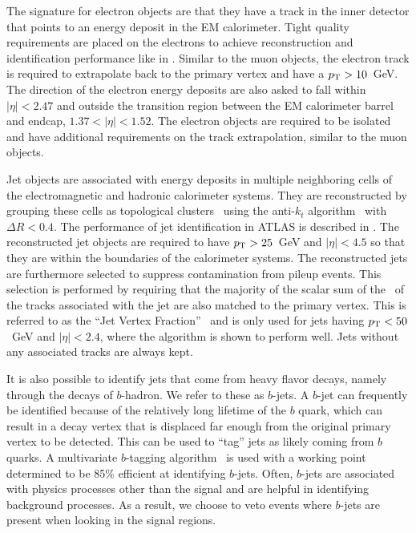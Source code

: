 The signature for electron objects are that they have a track in the inner
detector that points to an energy deposit in the EM calorimeter.
Tight quality requirements are placed on the electrons to achieve
reconstruction and identification performance like in \cite{Aad:1744017}.
Similar to the muon objects, 
the electron track is required to extrapolate back to 
the primary vertex and have a $p_{\mathrm{T}}>10$~GeV.
The direction of the electron energy 
deposits are also asked to fall within $|\eta| < 2.47$ and outside the 
transition region between the EM calorimeter 
barrel and endcap, $1.37 < |\eta| < 1.52$.
The electron objects are required to be isolated and have additional
requirements on the track extrapolation, similar to the muon objects.  


Jet objects are associated with energy deposits in multiple 
neighboring cells of the electromagnetic and hadronic calorimeter systems.
They are reconstructed by grouping these cells
as topological clusters~\cite{Lampl:1099735}
using the anti-$k_t$ algorithm~\cite{Cacciari:2008gp} with $\Delta R < 0.4$.
The performance of jet identification in ATLAS is described in \cite{Aad:2016upy}.
The reconstructed jet objects are required to have 
$p_{\mathrm{T}}>25$~GeV and $|\eta|<4.5$ so that
they are within the boundaries of the calorimeter systems.
The reconstructed jets are furthermore selected to suppress 
contamination from pileup events. This selection is performed by 
requiring that the majority of the
scalar sum of the \pt~of the tracks associated with the 
jet are also matched to the primary vertex. This is referred to
as the ``Jet Vertex Fraction''~\cite{Miller:1206864, ATLAS-CONF-2013-083}
and is only used for jets having $p_{\mathrm{T}} < 50$~GeV and $|\eta|<2.4$, where
the algorithm is shown to perform well. Jets without any associated
tracks are always kept. 

It is also possible to identify jets that come from heavy flavor
decays, namely through the decays of $b$-hadron. We refer
to these as $b$-jets. A $b$-jet can frequently be identified 
because of the relatively long lifetime of the $b$ quark, which can 
result in a decay vertex that is displaced far enough
from the original primary vertex to be detected.
This can be used to ``tag'' jets as likely coming from
$b$ quarks. A multivariate $b$-tagging algorithm~\cite{ATLAS-CONF-2014-004}
is used with a working point determined to be 85\% efficient at
identifying $b$-jets. %
Often, $b$-jets are associated with physics processes other than the signal
and are helpful in identifying background processes.
As a result, we choose to veto events where 
$b$-jets are present when looking in the signal regions.


